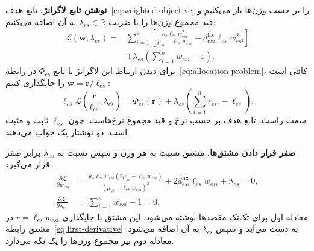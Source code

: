 \textbf{نوشتن تابع لاگرانژ.}
تابع هدف~\eqref{eq:weighted-objective} را بر حسب وزن‌ها باز می‌کنیم و قید مجموع وزن‌ها را با ضریب $\lambda_{es}\in\mathbb R$ به آن اضافه می‌کنیم:
\begin{equation}
\begin{aligned}
 \mathcal L(\mathbf w,\lambda_{es})={}&
 \sum_{i=1}^{n}\left[
 \frac{\kappa_s\ell_{es}w_{esi}^{2}}
      {\mu_{si}-\ell_{es}w_{esi}}
 +d^{\mathrm{fix}}_{esi}\ell_{es}w_{esi}^{2}\right]\\
 &+\lambda_{es}\left(\sum_{i=1}^{n}w_{esi}-1\right).
\end{aligned}
 \label{eq:lagrangian}
\end{equation}
برای دیدن ارتباط این لاگرانژ با تابع $\Phi_{es}$ در رابطه~\eqref{eq:allocation-problem}، کافی است $\mathbf w=\mathbf r/\ell_{es}$ را جایگذاری کنیم:
\begin{equation}
 \ell_{es}\mathcal L\left(\frac{\mathbf r}{\ell_{es}},\lambda_{es}\right)
 =\Phi_{es}(\mathbf r)
  +\lambda_{es}\left(\sum_{i=1}^{n}r_{esi}-\ell_{es}\right).
 \label{eq:lagrange-scaling}
\end{equation}
سمت راست، تابع هدف بر حسب نرخ و قید مجموع نرخ‌هاست. چون $\ell_{es}$ ثابت و مثبت است، دو نوشتار یک جواب می‌دهند.

\textbf{صفر قرار دادن مشتق‌ها.}
مشتق نسبت به هر وزن و سپس نسبت به $\lambda_{es}$ برابر صفر قرار می‌گیرد:
\begin{equation}
\begin{aligned}
 \frac{\partial\mathcal L}{\partial w_{esi}}
 &={\frac{\kappa_s\ell_{es}w_{esi}
           (2\mu_{si}-\ell_{es}w_{esi})}
          {(\mu_{si}-\ell_{es}w_{esi})^{2}}}
   +2d^{\mathrm{fix}}_{esi}\ell_{es}w_{esi}
   +\lambda_{es}=0,\\
 \frac{\partial\mathcal L}{\partial\lambda_{es}}
 &=\sum_{i=1}^{n}w_{esi}-1=0.
\end{aligned}
 \label{eq:weight-stationarity}
\end{equation}
معادله اول برای تک‌تک مقصدها نوشته می‌شود. این مشتق با جایگذاری $r=\ell_{es}w_{esi}$ در مشتق رابطه~\eqref{eq:first-derivative} به دست می‌آید و سپس $\lambda_{es}$ به آن اضافه می‌شود. معادله دوم نیز مجموع وزن‌ها را یک نگه می‌دارد.

